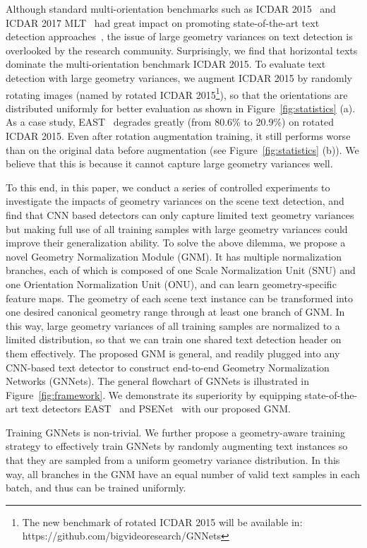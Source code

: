 \documentclass[10pt,twocolumn,letterpaper]{article}
\begin{document}
Although standard multi-orientation benchmarks such as ICDAR 2015~\cite{karatzas2015icdar} and ICDAR 2017 MLT~\cite{nayef2017icdar2017} had great impact on promoting state-of-the-art text detection approaches~\cite{li2018shape,Zhou2017}, the issue of large geometry variances on text detection is overlooked by the research community.
Surprisingly,  we find that horizontal texts dominate the multi-orientation benchmark ICDAR 2015. To evaluate text detection with large geometry variances, we augment ICDAR 2015 by randomly rotating images (named by rotated ICDAR 2015\footnote{The new benchmark of rotated ICDAR 2015 will be available in: https://github.com/bigvideoresearch/GNNets}), so that the orientations are distributed uniformly for better evaluation as shown in Figure~\ref{fig:statistics} (a). As a case study, EAST~\cite{Zhou2017} degrades greatly (from 80.6\% to 20.9\%) on rotated ICDAR 2015. Even after rotation augmentation training, it still performs worse than on the original data before augmentation (see Figure~\ref{fig:statistics} (b)). We believe that this is because it cannot capture large geometry variances well.




To this end, in this paper, we conduct a series of controlled experiments to investigate the impacts of geometry variances on the scene text detection, and find that CNN based detectors can only capture limited text geometry variances but making full use of all training samples with large geometry variances could improve their generalization ability.  To solve the above dilemma, we propose a novel Geometry Normalization Module (GNM). It has multiple normalization branches, each of which is composed of one Scale Normalization Unit (SNU) and one Orientation Normalization Unit (ONU), and can learn geometry-specific feature maps.  The geometry of each scene text instance can be transformed into one desired canonical geometry range through at least one branch of GNM. In this way, large geometry variances of all training samples are normalized to a limited distribution, so that we can train one shared text detection header on them effectively. The proposed GNM is general, and readily plugged into any CNN-based text detector to construct end-to-end Geometry Normalization Networks (GNNets). The general flowchart of GNNets is illustrated in Figure~\ref{fig:framework}. We demonstrate its superiority by equipping state-of-the-art text detectors EAST~\cite{Zhou2017} and PSENet~\cite{li2018shape} with our proposed GNM.

Training GNNets is non-trivial. We further propose a geometry-aware training strategy to effectively train GNNets by randomly augmenting text instances so that they are sampled from a uniform geometry variance distribution. In this way, all branches in the GNM have an equal number of valid text samples in each batch, and thus can be trained uniformly.
\end{document}
